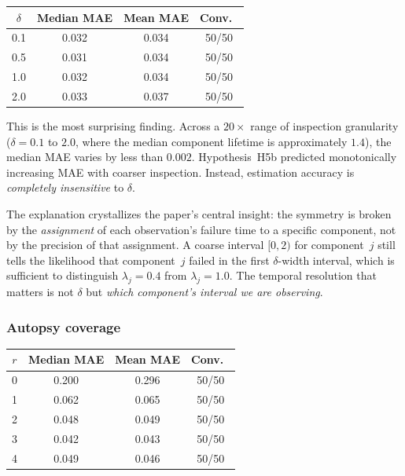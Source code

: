 \documentclass[12pt]{article}
\begin{document}
\begin{center}
\begin{tabular}{@{}cccc@{}}
\toprule
$\delta$ & Median MAE & Mean MAE & Conv.\ \\
\midrule
0.1 & 0.032 & 0.034 & 50/50 \\
0.5 & 0.031 & 0.034 & 50/50 \\
1.0 & 0.032 & 0.034 & 50/50 \\
2.0 & 0.033 & 0.037 & 50/50 \\
\bottomrule
\end{tabular}
\end{center}

This is the most surprising finding.  Across a $20\times$ range of
inspection granularity ($\delta = 0.1$ to $2.0$, where the median
component lifetime is approximately $1.4$), the median MAE varies by
less than $0.002$.  Hypothesis~H5b predicted monotonically increasing
MAE with coarser inspection.  Instead, estimation accuracy is
\emph{completely insensitive} to $\delta$.

The explanation crystallizes the paper's central insight: the symmetry is
broken by the \emph{assignment} of each observation's failure time to a
specific component, not by the precision of that assignment.  A
coarse interval $[0, 2)$ for component~$j$ still tells the likelihood
that component~$j$ failed in the first $\delta$-width interval, which is
sufficient to distinguish $\lambda_j = 0.4$ from $\lambda_j = 1.0$.
The temporal resolution that matters is not $\delta$ but
\emph{which component's interval we are observing}.

\subsubsection{Autopsy coverage}\label{sec:autopsy-sensitivity}

\begin{center}
\begin{tabular}{@{}cccc@{}}
\toprule
$r$ & Median MAE & Mean MAE & Conv.\ \\
\midrule
0 & 0.200 & 0.296 & 50/50 \\
1 & 0.062 & 0.065 & 50/50 \\
2 & 0.048 & 0.049 & 50/50 \\
3 & 0.042 & 0.043 & 50/50 \\
4 & 0.049 & 0.046 & 50/50 \\
\bottomrule
\end{tabular}
\end{center}
\end{document}
